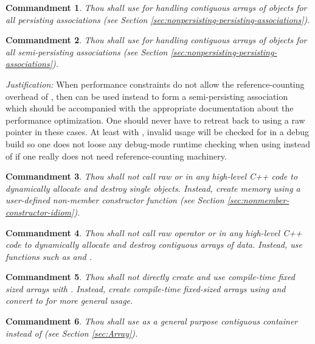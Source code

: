 \documentclass[pdf,ps2pdf,11pt]{SANDreport}
\newtheorem{commandment}{Commandment}
\begin{document}
\begin{commandment}
Thou shall use {} for handling contiguous arrays of
objects for all persisting associations (see Section
{}\ref{sec:nonpersisting-persisting-associations}).
\end{commandment}

\begin{commandment}\label{cmnd:arrayview-semi-persisting}
Thou shall use {} for handling contiguous arrays of
objects for all semi-persisting associations (see Section
{}\ref{sec:nonpersisting-persisting-associations}).
\end{commandment}
{}\textit{Justification:} When performance constraints do not allow
the reference-counting overhead of {}, then
{} can be used instead to form a semi-persisting
association which should be accompanied with the appropriate
documentation about the performance optimization.  One should never
have to retreat back to using a raw pointer in these cases.  At least
with {}, invalid usage will be checked for in a debug
build so one does not loose any debug-mode runtime checking when using
{} instead of {} if one really does not
need reference-counting machinery.

\begin{commandment}
Thou shall not call raw {} or {} in any
high-level C++ code to dynamically allocate and destroy single
objects.  Instead, create memory using a user-defined non-member
constructor function (see Section
{}\ref{sec:nonmember-constructor-idiom}).
\end{commandment}

\begin{commandment}
Thou shall not call raw operator {} or {} in any high-level C++ code to dynamically allocate and destroy
contiguous arrays of data.  Instead, use functions such as
{} and {}.
\end{commandment}

\begin{commandment}
Thou shall not directly create and use compile-time fixed sized arrays
with {}.  Instead, create compile-time fixed-sized arrays
using {} and convert to
{} for more general usage.
\end{commandment}

\begin{commandment}
Thou shall use {} as a general purpose
contiguous container instead of {} (see Section
{}\ref{sec:Array}).
\end{commandment}
\end{document}
